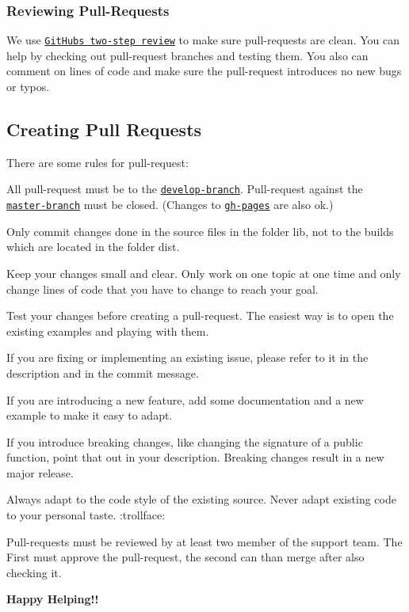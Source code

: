 \subsubsection*{Reviewing Pull-\/\+Requests}

We use \href{//help.github.com/articles/about-pull-request-reviews/}{\tt Git\+Hub\textquotesingle{}s two-\/step review} to make sure pull-\/requests are clean. You can help by checking out pull-\/request branches and testing them. You also can comment on lines of code and make sure the pull-\/request introduces no new bugs or typos.

\subsection*{Creating Pull Requests}

There are some rules for pull-\/request\+:


\begin{DoxyItemize}
\item All pull-\/request must be to the \href{//github.com/almende/vis/tree/develop}{\tt develop-\/branch}. Pull-\/request against the \href{//github.com/almende/vis/tree/master}{\tt master-\/branch} must be closed. (Changes to \href{//github.com/almende/vis/tree/gh-pages}{\tt gh-\/pages} are also ok.)
\item Only commit changes done in the source files in the folder {\ttfamily lib}, not to the builds which are located in the folder {\ttfamily dist}.
\item Keep your changes small and clear. Only work on one topic at one time and only change lines of code that you have to change to reach your goal.
\item Test your changes before creating a pull-\/request. The easiest way is to open the existing examples and playing with them.
\item If you are fixing or implementing an existing issue, please refer to it in the description and in the commit message.
\item If you are introducing a new feature, add some documentation and a new example to make it easy to adapt.
\item If you introduce breaking changes, like changing the signature of a public function, point that out in your description. Breaking changes result in a new major release.
\item Always adapt to the code style of the existing source. Never adapt existing code to your personal taste. \+:trollface\+:
\item Pull-\/requests must be reviewed by at least two member of the support team. The First must approve the pull-\/request, the second can than merge after also checking it.
\end{DoxyItemize}

{\bfseries Happy Helping!!} 